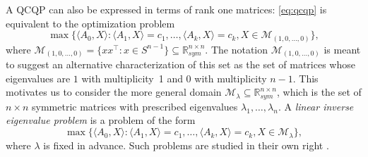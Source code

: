 \documentclass{article}
\numberwithin{equation}{section}
\newcommand{\R}{\mathbb{R}}
\newcommand{\cM}{{\mathcal{M}}}
\newcommand{\demph}[1]{\emph{{\color{RoyalBlue}#1}}}
\begin{document}


A QCQP can also be expressed in terms of rank one matrices: \eqref{eq:qcqp} is equivalent to the optimization problem
\begin{equation}
    \max \{\langle A_0, X\rangle : \langle A_1, X\rangle = c_1, \dots, \langle A_k, X\rangle = c_k, X \in \cM_{(1,0,\dots, 0)}\},
\end{equation}
where $\cM_{(1,0,\dots, 0)} = \{xx^{\intercal} : x \in S^{n-1}\} \subseteq \R^{n\times n}_{sym}$.
The notation $\cM_{(1,0,\dots, 0)}$ is meant to suggest an alternative characterization of this set as the set of matrices whose eigenvalues are $1$ with multiplicity~1 and 0 with multiplicity $n-1$. This motivates us to consider the more general domain $\cM_{\lambda} \subseteq \R^{n \times n}_{sym}$, which is the set of $n \times n$ symmetric matrices with prescribed eigenvalues $\lambda_1, \dots, \lambda_n$. 
A \demph{linear inverse eigenvalue problem} is a problem of the form 
\begin{equation}
    \max \{\langle A_0, X\rangle : \langle A_1, X\rangle = c_1, \dots, \langle A_k, X\rangle = c_k, X \in \cM_{\lambda}\},
    \label{eq:inverse_eigenvalue}\tag{opt-LIEP}
\end{equation}
where $\lambda$  is
fixed in advance. Such problems are studied in their own right \cite{candogan2021note, landau1994inverse}.
\end{document}
